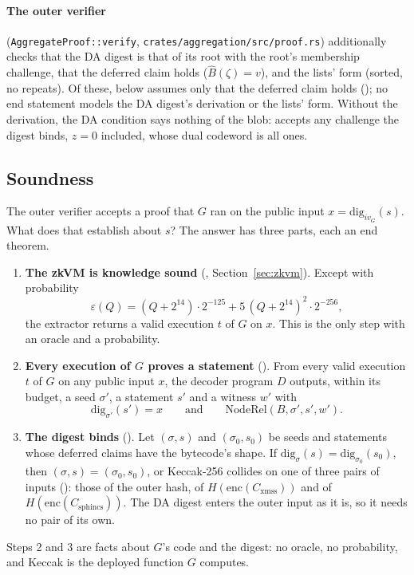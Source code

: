 \documentclass[11pt]{article}
\newcommand{\Cx}{C_{\mathrm{xmss}}}
\newcommand{\Cs}{C_{\mathrm{sphincs}}}
\newcommand{\enc}{\mathrm{enc}}
\begin{document}
\paragraph{The outer verifier} (\texttt{AggregateProof::verify},
\texttt{crates/aggregation/src/proof.rs}) additionally checks that the DA digest is that of its root
with the root's membership challenge, that the deferred claim holds ($\widehat{B}(\zeta) = v$), and
the lists' form (sorted, no repeats). Of these,  below
assumes only that the deferred claim holds (); no end statement
models the DA digest's derivation or the lists' form. Without the derivation, the DA condition says
nothing of the blob:  accepts any challenge the digest binds, $z = 0$
included, whose dual codeword is all ones.

\subsection{Soundness}

The outer verifier accepts a proof that $G$ ran on the public input $x = \mathrm{dig}_{iv_G}(s)$.
What does that establish about $s$? The answer has three parts, each an end theorem.
\begin{enumerate}
\item \textbf{The zkVM is knowledge sound} (,
Section~\ref{sec:zkvm}). Except with probability
\[
\varepsilon(Q) = (Q+2^{14})\cdot 2^{-125} + 5\,(Q+2^{14})^2\cdot 2^{-256},
\]
the extractor returns a valid execution $t$ of $G$ on $x$. This is the only step with an oracle
and a probability.
\item \textbf{Every execution of $G$ proves a statement} (). From
every valid execution $t$ of $G$ on any public input $x$, the decoder program $D$ outputs, within
its budget, a seed $\sigma'$, a statement $s'$ and a witness $w'$ with
\[
\mathrm{dig}_{\sigma'}(s') = x \qquad\text{and}\qquad \mathrm{NodeRel}(B, \sigma', s', w').
\]
\item \textbf{The digest binds} (). Let $(\sigma, s)$ and $(\sigma_0, s_0)$
be seeds and statements whose deferred claims have the bytecode's shape. If
$\mathrm{dig}_\sigma(s) = \mathrm{dig}_{\sigma_0}(s_0)$, then $(\sigma, s) = (\sigma_0, s_0)$, or
Keccak-256 collides on one of three pairs of inputs (): those of the
outer hash, of $H(\enc(\Cx))$ and of $H(\enc(\Cs))$. The DA digest enters the outer input as it
is, so it needs no pair of its own.
\end{enumerate}
Steps 2 and 3 are facts about $G$'s code and the digest: no oracle, no probability, and Keccak is
the deployed function $G$ computes.
\end{document}
